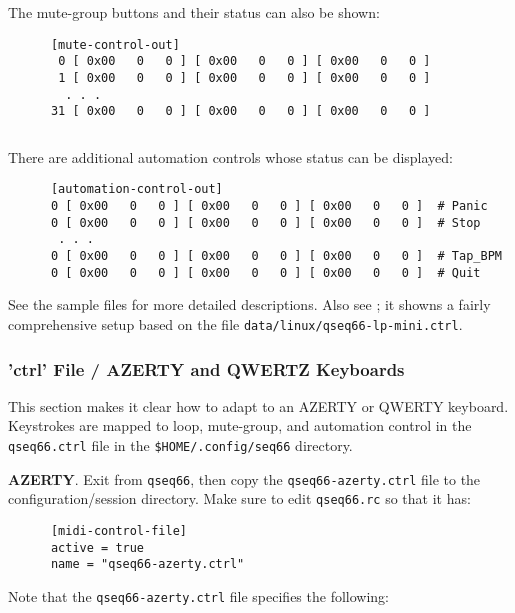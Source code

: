    The mute-group buttons and their status can also be shown:

   \begin{verbatim}
      [mute-control-out]
       0 [ 0x00   0   0 ] [ 0x00   0   0 ] [ 0x00   0   0 ]
       1 [ 0x00   0   0 ] [ 0x00   0   0 ] [ 0x00   0   0 ]
        . . .
      31 [ 0x00   0   0 ] [ 0x00   0   0 ] [ 0x00   0   0 ]
   \end{verbatim}

   \begin{verbatim}
   \end{verbatim}

   There are additional automation controls whose status can be displayed:

   \begin{verbatim}
      [automation-control-out]
      0 [ 0x00   0   0 ] [ 0x00   0   0 ] [ 0x00   0   0 ]  # Panic
      0 [ 0x00   0   0 ] [ 0x00   0   0 ] [ 0x00   0   0 ]  # Stop
       . . .
      0 [ 0x00   0   0 ] [ 0x00   0   0 ] [ 0x00   0   0 ]  # Tap_BPM
      0 [ 0x00   0   0 ] [ 0x00   0   0 ] [ 0x00   0   0 ]  # Quit
   \end{verbatim}

   See the sample files for more detailed descriptions.
   Also see ; it showns a fairly comprehensive
   setup based on the file \texttt{data/linux/qseq66-lp-mini.ctrl}.

\subsubsection{'ctrl' File / AZERTY and QWERTZ Keyboards}
\label{subsubsec:configuration_ctrl_azerty}

   This section makes it clear how to adapt to an AZERTY or QWERTY keyboard.
   Keystrokes are mapped to loop, mute-group, and automation control in the
   \texttt{qseq66.ctrl} file in the \texttt{\$HOME/.config/seq66} directory.

   \textbf{AZERTY}.
   Exit from \texttt{qseq66}, then copy the \texttt{qseq66-azerty.ctrl}
   file to the configuration/session directory.
   Make sure to edit \texttt{qseq66.rc} so that it has:

   \begin{verbatim}
      [midi-control-file]
      active = true
      name = "qseq66-azerty.ctrl"
   \end{verbatim}

   Note that the \texttt{qseq66-azerty.ctrl} file specifies the following:

